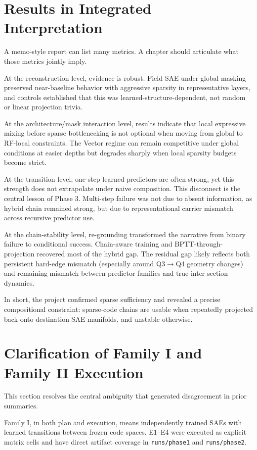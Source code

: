 \documentclass[11pt]{article}
\begin{document}
\section{Results in Integrated Interpretation}
A memo-style report can list many metrics. A chapter should articulate what those metrics jointly imply.

At the reconstruction level, evidence is robust. Field SAE under global masking preserved near-baseline behavior with aggressive sparsity in representative layers, and controls established that this was learned-structure-dependent, not random or linear projection trivia.

At the architecture/mask interaction level, results indicate that local expressive mixing before sparse bottlenecking is not optional when moving from global to RF-local constraints. The Vector regime can remain competitive under global conditions at easier depths but degrades sharply when local sparsity budgets become strict.

At the transition level, one-step learned predictors are often strong, yet this strength does not extrapolate under naive composition. This disconnect is the central lesson of Phase 3. Multi-step failure was not due to absent information, as hybrid chain remained strong, but due to representational carrier mismatch across recursive predictor use.

At the chain-stability level, re-grounding transformed the narrative from binary failure to conditional success. Chain-aware training and BPTT-through-projection recovered most of the hybrid gap. The residual gap likely reflects both persistent hard-edge mismatch (especially around Q3$\rightarrow$Q4 geometry changes) and remaining mismatch between predictor families and true inter-section dynamics.

In short, the project confirmed sparse sufficiency and revealed a precise compositional constraint: sparse-code chains are usable when repeatedly projected back onto destination SAE manifolds, and unstable otherwise.

\section{Clarification of Family I and Family II Execution}
This section resolves the central ambiguity that generated disagreement in prior summaries.

Family I, in both plan and execution, means independently trained SAEs with learned transitions between frozen code spaces. E1--E4 were executed as explicit matrix cells and have direct artifact coverage in \texttt{runs/phase1} and \texttt{runs/phase2}.
\end{document}
